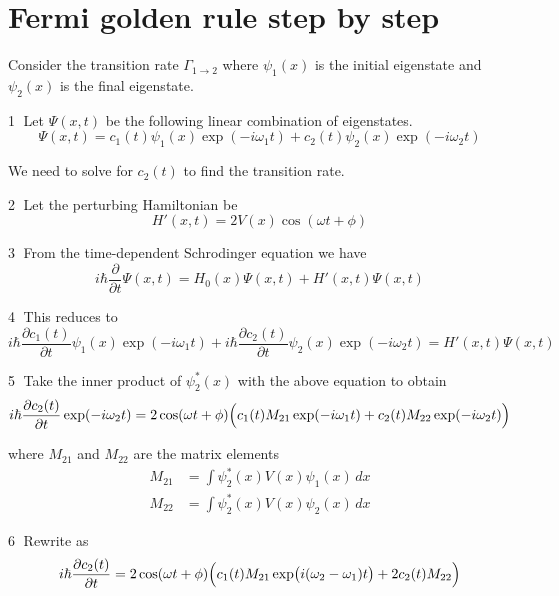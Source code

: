 \documentclass[12pt]{article}
\begin{document}
\section*{Fermi golden rule step by step}
Consider the transition rate $\Gamma_{1\rightarrow2}$
where $\psi_1(x)$ is the initial eigenstate
and $\psi_2(x)$ is the final eigenstate.

\bigskip
\textcircled{\scriptsize1}
Let $\Psi(x,t)$ be the following linear combination of eigenstates.
\begin{equation*}
\Psi(x,t)=c_1(t)\psi_1(x)\exp(-i\omega_1t)+c_2(t)\psi_2(x)\exp(-i\omega_2t)
\end{equation*}

We need to solve for $c_2(t)$ to find the transition rate.

\bigskip
\textcircled{\scriptsize2}
Let the perturbing Hamiltonian be
\begin{equation*}
H'(x,t)=2V(x)\cos(\omega t+\phi)
\end{equation*}

\textcircled{\scriptsize3}
From the time-dependent Schrodinger equation we have
\begin{equation*}
i\hbar\frac{\partial}{\partial t}\Psi(x,t)=H_0(x)\Psi(x,t)+H'(x,t)\Psi(x,t)
\end{equation*}

\textcircled{\scriptsize4}
This reduces to
\begin{equation*}
i\hbar\frac{\partial c_1(t)}{\partial t}\psi_1(x)\exp(-i\omega_1t)
+i\hbar\frac{\partial c_2(t)}{\partial t}\psi_2(x)\exp(-i\omega_2t)
=H'(x,t)\Psi(x,t)
\end{equation*}

\textcircled{\scriptsize5}
Take the inner product of $\psi_2^*(x)$ with the above equation to obtain
\begin{equation*}
i\hbar\frac{\partial c_2(t)}{\partial t}\exp(-i\omega_2t)
=2\cos(\omega t+\phi)
\Bigl(
c_1(t)M_{21}\exp(-i\omega_1t)+
c_2(t)M_{22}\exp(-i\omega_2t)
\Bigr)
\end{equation*}

where $M_{21}$ and $M_{22}$ are the matrix elements
\begin{align*}
M_{21}&=\int\psi_2^*(x)V(x)\psi_1(x)\,dx
\\
M_{22}&=\int\psi_2^*(x)V(x)\psi_2(x)\,dx
\end{align*}

\textcircled{\scriptsize6}
Rewrite as
\begin{equation*}
i\hbar\frac{\partial c_2(t)}{\partial t}
=2\cos(\omega t+\phi)
\Bigl(
c_1(t)M_{21}\exp\bigl(i(\omega_2-\omega_1)t\bigr)+2c_2(t)M_{22}
\Bigr)
\end{equation*}
\end{document}
